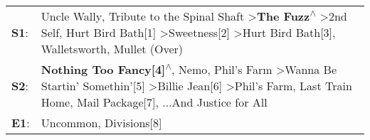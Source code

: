 \begin{supertabular}{p{0.03\textwidth}p{0.92\textwidth}}
 \textbf{S1}:  &       Uncle Wally\textsuperscript{}, \enspace Tribute to the Spinal Shaft\textsuperscript{} \textgreater \enspace \textbf{The Fuzz\textsuperscript{$\wedge$}} \textgreater \enspace 2nd Self\textsuperscript{}, \enspace Hurt Bird Bath[1]\textsuperscript{} \textgreater \enspace Sweetness[2]\textsuperscript{} \textgreater \enspace Hurt Bird Bath[3]\textsuperscript{}, \enspace Walletsworth\textsuperscript{}, \enspace Mullet (Over)\textsuperscript{}  \enspace  \\
 \textbf{S2}:  &  \textbf{Nothing Too Fancy[4]\textsuperscript{$\wedge$}}, \enspace Nemo\textsuperscript{}, \enspace Phil's Farm\textsuperscript{} \textgreater \enspace Wanna Be Startin' Somethin'[5]\textsuperscript{} \textgreater \enspace Billie Jean[6]\textsuperscript{} \textgreater \enspace Phil's Farm\textsuperscript{}, \enspace Last Train Home\textsuperscript{}, \enspace Mail Package[7]\textsuperscript{}, \enspace ...And Justice for All\textsuperscript{}  \enspace  \\
 \textbf{E1}:  &                                                                                                                                                                                                                                                                                                                                                                                            Uncommon\textsuperscript{}, \enspace Divisions[8]\textsuperscript{}  \enspace  \\
\end{supertabular}
